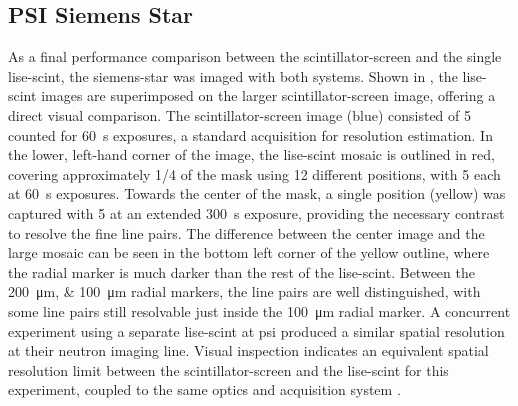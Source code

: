 \documentclass[../../../main.tex]{subfiles}%
\begin{document}
%
    \subsection{PSI Siemens Star}%
    \label{sec:chapter-4:scintillator-single:psi-mask}%
    As a final performance comparison between the \gls{scintillator-screen} and the single \gls{lise-scint}, the \gls{siemens-star} was imaged with both systems.
    Shown in , the \gls{lise-scint} images are superimposed on the larger \gls{scintillator-screen} image, offering a direct visual comparison.
    The \gls{scintillator-screen} image (blue) consisted of \SI{5}{\frames} counted for \SI{60}{\second} exposures, a standard acquisition for resolution estimation.
    In the lower, left-hand corner of the image, the \gls{lise-scint} mosaic is outlined in red, covering approximately \num{1/4} of the mask using \num{12} different positions, with \SI{5}{\frames} each at \SI{60}{\second} exposures.
    Towards the center of the mask, a single position (yellow) was captured with \SI{5}{\frames} at an extended \SI{300}{\second} exposure, providing the necessary contrast to resolve the fine line pairs.
    The difference between the center image and the large mosaic can be seen in the bottom left corner of the yellow outline, where the radial marker is much darker than the rest of the \gls{lise-scint}.
    Between the \SIlist{200;100}{\micro\meter} radial markers, the line pairs are well distinguished, with some line pairs still resolvable just inside the \SI{100}{\micro\meter} radial marker.
    A concurrent experiment using a separate \gls{lise-scint} at \gls{psi} produced a similar spatial resolution at their neutron imaging line.
    Visual inspection indicates an equivalent spatial resolution limit between the \gls{scintillator-screen} and the \gls{lise-scint} for this experiment, coupled to the same optics and acquisition system \cite{Lukosi_2016a}.
\end{document}
